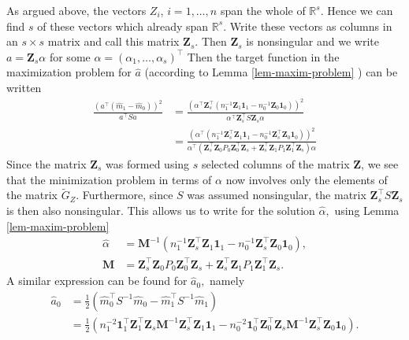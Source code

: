 \documentclass[11pt,twoside]{article}%
\theoremstyle{change}
\begin{document}
As argued above, the vectors $Z_{i}$, $i=1,\ldots,n$ span the whole of
$\mathbb{R}^{s}$. Hence we can find $s$ of these vectors which already span
$\mathbb{R}^{s}$. Write these vectors as columns in an $s\times s$ matrix and
call this matrix $\mathbf{Z}_{s}$. Then $\mathbf{Z}_{s}$ is nonsingular and we
write $a=\mathbf{Z}_{s}\alpha$ for some $\alpha=\left(  \alpha_{1}%
,\ldots,\alpha_{s}\right)  ^{\top}$ Then the target function in the
maximization problem for $\hat{a}$ (according to Lemma \ref{lem-maxim-problem}%
) can be written
\begin{align*}
\frac{\left(  a^{\top}\left(  \hat{m}_{1}-\hat{m}_{0}\right)  \right)  ^{2}%
}{a^{\top}Sa}  & =\frac{\left(  \alpha^{\top}\mathbf{Z}_{s}^{\top}\left(
n_{1}^{-1}\mathbf{Z}_{1}\mathbf{1}_{1}-n_{0}^{-1}\mathbf{Z}_{0}\mathbf{1}%
_{0}\right)  \right)  ^{2}}{\alpha^{\top}\mathbf{Z}_{s}^{\top}S\mathbf{Z}%
_{s}\alpha}\\
& =\frac{\left(  \alpha^{\top}\left(  n_{1}^{-1}\mathbf{Z}_{s}^{\top
}\mathbf{Z}_{1}\mathbf{1}_{1}-n_{0}^{-1}\mathbf{Z}_{s}^{\top}\mathbf{Z}%
_{0}\mathbf{1}_{0}\right)  \right)  ^{2}}{\alpha^{\top}\left(  \mathbf{Z}%
_{s}^{\top}\mathbf{Z}_{0}P_{0}\mathbf{Z}_{0}^{\top}\mathbf{Z}_{s}%
+\mathbf{Z}_{s}^{\top}\mathbf{Z}_{1}P_{1}\mathbf{Z}_{1}^{\top}\mathbf{Z}%
_{s}\right)  \alpha}%
\end{align*}
Since the matrix $\mathbf{Z}_{s}$ was formed using $s$ selected columns of the
matrix $\mathbf{Z}$, we see that the minimization problem in terms of $\alpha$
now involves only the elements of the matrix $\tilde{G}_{Z}$. Furthermore,
since $S$ was assumed nonsingular, the matrix $\mathbf{Z}_{s}^{\top
}S\mathbf{Z}_{s}$ is then also nonsingular. This allows us to write for the
solution $\hat{\alpha},$ using Lemma \ref{lem-maxim-problem}
\begin{align*}
\hat{\alpha}  & =\mathbf{M}^{-1}\left(  n_{1}^{-1}\mathbf{Z}_{s}^{\top
}\mathbf{Z}_{1}\mathbf{1}_{1}-n_{0}^{-1}\mathbf{Z}_{s}^{\top}\mathbf{Z}%
_{0}\mathbf{1}_{0}\right)  ,\\
\mathbf{M}  & =\mathbf{Z}_{s}^{\top}\mathbf{Z}_{0}P_{0}\mathbf{Z}_{0}^{\top
}\mathbf{Z}_{s}+\mathbf{Z}_{s}^{\top}\mathbf{Z}_{1}P_{1}\mathbf{Z}_{1}^{\top
}\mathbf{Z}_{s}.
\end{align*}
A similar expression can be found for $\hat{a}_{0},$ namely
\begin{align*}
\hat{a}_{0}  & =\frac{1}{2}\left(  \hat{m}_{0}^{\top}S^{-1}\hat{m}_{0}-\hat
{m}_{1}^{\top}S^{-1}\hat{m}_{1}\right) \\
& =\frac{1}{2}\left(  n_{1}^{-2}\mathbf{1}_{1}^{\top}\mathbf{Z}_{1}^{\top
}\mathbf{Z}_{s}\mathbf{M}^{-1}\mathbf{Z}_{s}^{\top}\mathbf{Z}_{1}%
\mathbf{1}_{1}-n_{0}^{-2}\mathbf{1}_{0}^{\top}\mathbf{Z}_{0}^{\top}%
\mathbf{Z}_{s}\mathbf{M}^{-1}\mathbf{Z}_{s}^{\top}\mathbf{Z}_{0}\mathbf{1}%
_{0}\right)  .
\end{align*}
\ 
\end{document}
